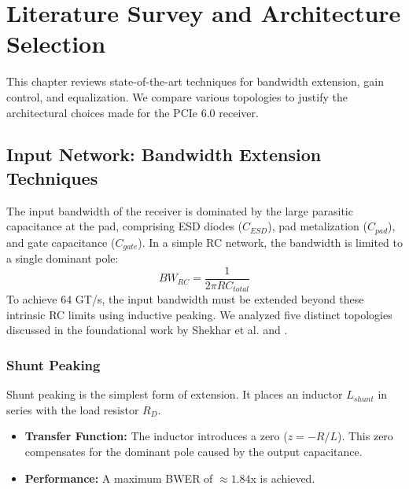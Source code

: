 \chapter{Literature Survey and Architecture Selection}
\label{Chapter3}

This chapter reviews state-of-the-art techniques for bandwidth extension, gain control, and equalization. We compare various topologies to justify the architectural choices made for the PCIe 6.0 receiver.

\section{Input Network: Bandwidth Extension Techniques}

The input bandwidth of the receiver is dominated by the large parasitic capacitance at the pad, comprising ESD diodes ($C_{ESD}$), pad metalization ($C_{pad}$), and gate capacitance ($C_{gate}$). In a simple RC network, the bandwidth is limited to a single dominant pole:
\begin{equation}
    BW_{RC} = \frac{1}{2\pi R C_{total}}
\end{equation}
To achieve 64 GT/s, the input bandwidth must be extended beyond these intrinsic RC limits using inductive peaking. We analyzed five distinct topologies discussed in the foundational work by Shekhar et al. \cite{shekhar} and \cite{chen2017}.

\subsection{Shunt Peaking}
Shunt peaking is the simplest form of extension. It places an inductor $L_{shunt}$ in series with the load resistor $R_D$.
\begin{itemize}
    \item \textbf{Transfer Function:} The inductor introduces a zero ($z = -R/L$). This zero compensates for the dominant pole caused by the output capacitance.
    \item \textbf{Performance:} A maximum BWER of $\approx 1.84$x is achieved.
\end{itemize}

